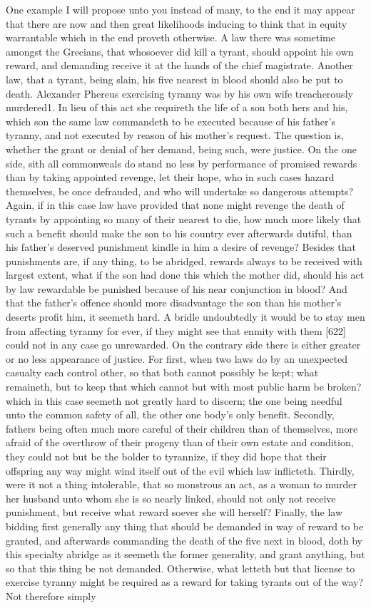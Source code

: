 One example I will propose unto you instead of many, to the end it may appear that there are now and then great likelihoods inducing to think that in equity warrantable which in the end proveth otherwise. A law there was sometime amongst the Grecians, that whosoever did kill a tyrant, should appoint his own reward, and demanding receive it at the hands of the chief magistrate. Another law, that a tyrant, being slain, his five nearest in blood should also be put to death. Alexander Phereus exercising tyranny was by his own wife treacherously murdered1. In lieu of this act she requireth the life of a son both hers and his, which son the same law commandeth to be executed because of his father’s tyranny, and not executed by reason of his mother’s request. The question is, whether the grant or denial of her demand, being such, were justice. On the one side, sith all commonweals do stand no less by performance of promised rewards than by taking appointed revenge, let their hope, who in such cases hazard themselves, be once defrauded, and who will undertake so dangerous attempts? Again, if in this case law have provided that none might revenge the death of tyrants by appointing so many of their nearest to die, how much more likely that such a benefit should make the son to his country ever afterwards dutiful, than his father’s deserved punishment kindle in him a desire of revenge? Besides that punishments are, if any thing, to be abridged, rewards always to be received with largest extent, what if the son had done this which the mother did, should his act by law rewardable be punished because of his near conjunction in blood? And that the father’s offence should more disadvantage the son than his mother’s deserts profit him, it seemeth hard. A bridle undoubtedly it would be to stay men from affecting tyranny for ever, if they might see that enmity with them [622] could not in any case go unrewarded. On the contrary side there is either greater or no less appearance of justice. For first, when two laws do by an unexpected casualty each control other, so that both cannot possibly be kept; what remaineth, but to keep that which cannot but with most public harm be broken? which in this case seemeth not greatly hard to discern; the one being needful unto the common safety of all, the other one body’s only benefit. Secondly, fathers being often much more careful of their children than of themselves, more afraid of the overthrow of their progeny than of their own estate and condition, they could not but be the bolder to tyrannize, if they did hope that their offspring any way might wind itself out of the evil which law inflicteth. Thirdly, were it not a thing intolerable, that so monstrous an act, as a woman to murder her husband unto whom she is so nearly linked, should not only not receive punishment, but receive what reward soever she will herself? Finally, the law bidding first generally any thing that should be demanded in way of reward to be granted, and afterwards commanding the death of the five next in blood, doth by this specialty abridge as it seemeth the former generality, and grant anything, but so that this thing be not demanded. Otherwise, what letteth but that license to exercise tyranny might be required as a reward for taking tyrants out of the way? Not therefore simply 